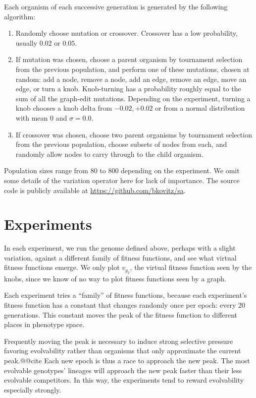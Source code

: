 \documentclass[letterpaper]{article}
\begin{document}
Each organism of each successive generation is generated by the following
algorithm:
\begin{enumerate}
  \item Randomly choose mutation or crossover. Crossover has a low probability,
    usually $0.02$ or $0.05$.
  \item If mutation was chosen, choose a parent organism by tournament selection
    from the previous population, and perform one of these mutations, chosen at
    random: add a node, remove a node, add an edge, remove an edge, move an
    edge, or turn a knob. Knob-turning has a probability roughly equal to the
    sum of all the graph-edit mutations. Depending on the experiment, turning a
    knob chooses a knob delta from ${-0.02, +0.02}$ or from a normal
    distribution with mean 0 and $\sigma = 0.0$.
  \item If crossover was chosen, choose two parent organisms by tournament
    selection from the previous population, choose subsets of nodes from each,
    and randomly allow nodes to carry through to the child organism.
\end{enumerate}
Population sizes range from 80 to 800 depending on the experiment. We omit some
details of the variation operator here for lack of importance. The source code
is publicly available at
\href{https://github.com/bkovitz/sa}{https://github.com/bkovitz/sa}.

\section{Experiments}

In each experiment, we run the genome defined above, perhaps with a slight
variation, against a different family of fitness functions, and see what
virtual fitness functions emerge. We only plot $v_{g_2}$, the virtual
fitness function seen by the knobs, since we know of no way to plot fitness
functions seen by a graph.

Each experiment tries a ``family'' of fitness functions, because each
experiment's fitness function has a constant that changes randomly once per
epoch: every 20 generations. This constant moves the peak of the fitness
function to different places in phenotype space.

Frequently moving the peak is necessary to induce strong selective pressure
favoring evolvability rather than organisms that only approximate the current
peak.@@cite Each new epoch is thus a race to approach the new peak. The most
evolvable genotypes' lineages will approach the new peak faster than their
less evolvable competitors. In this way, the experiments tend to reward
evolvability especially strongly.
\end{document}
